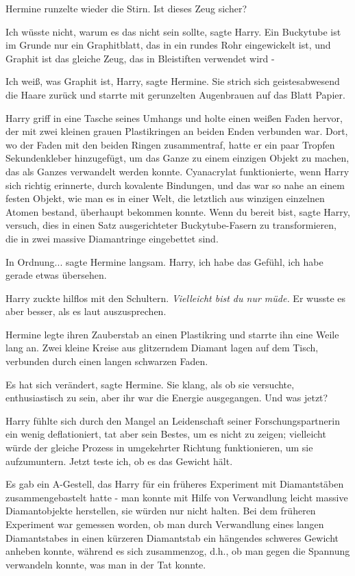 Hermine runzelte wieder die Stirn. \glqq{}Ist dieses Zeug sicher?\grqq{}

\glqq{}Ich wüsste nicht, warum es das nicht sein sollte\grqq{}, sagte Harry.
\glqq{}Ein Buckytube ist im Grunde nur ein Graphitblatt, das in ein rundes Rohr
eingewickelt ist, und Graphit ist das gleiche Zeug, das in Bleistiften verwendet
wird -\grqq{}

\glqq{}Ich weiß, was Graphit ist, Harry\grqq{}, sagte Hermine. Sie strich sich
geistesabwesend die Haare zurück und starrte mit gerunzelten Augenbrauen auf das
Blatt Papier.

Harry griff in eine Tasche seines Umhangs und holte einen weißen Faden hervor,
der mit zwei kleinen grauen Plastikringen an beiden Enden verbunden war. Dort,
wo der Faden mit den beiden Ringen zusammentraf, hatte er ein paar Tropfen
Sekundenkleber hinzugefügt, um das Ganze zu einem einzigen Objekt zu machen, das
als Ganzes verwandelt werden konnte. Cyanacrylat funktionierte, wenn Harry sich
richtig erinnerte, durch kovalente Bindungen, und das war so nahe an einem
\glqq{}festen Objekt\grqq{}, wie man es in einer Welt, die letztlich aus
winzigen einzelnen Atomen bestand, überhaupt bekommen konnte. \glqq{}Wenn du
bereit bist\grqq{}, sagte Harry, \glqq{}versuch, dies in einen Satz
ausgerichteter Buckytube-Fasern zu transformieren, die in zwei massive
Diamantringe eingebettet sind.\grqq{}

\glqq{}In Ordnung...\grqq{} sagte Hermine langsam. \glqq{}Harry, ich habe das
Gefühl, ich habe gerade etwas übersehen.\grqq{}

Harry zuckte hilflos mit den Schultern. \emph{Vielleicht bist du nur müde.} Er
wusste es aber besser, als es laut auszusprechen.

Hermine legte ihren Zauberstab an einen Plastikring und starrte ihn eine Weile
lang an. Zwei kleine Kreise aus glitzerndem Diamant lagen auf dem Tisch,
verbunden durch einen langen schwarzen Faden.

\glqq{}Es hat sich verändert\grqq{}, sagte Hermine. Sie klang, als ob sie
versuchte, enthusiastisch zu sein, aber ihr war die Energie ausgegangen. \glqq{}
Und was jetzt?\grqq{}

Harry fühlte sich durch den Mangel an Leidenschaft seiner Forschungspartnerin
ein wenig deflationiert, tat aber sein Bestes, um es nicht zu zeigen; vielleicht
würde der gleiche Prozess in umgekehrter Richtung funktionieren, um sie
aufzumuntern. \glqq{}Jetzt teste ich, ob es das Gewicht hält.\grqq{}

Es gab ein A-Gestell, das Harry für ein früheres Experiment mit Diamantstäben
zusammengebastelt hatte - man konnte mit Hilfe von Verwandlung leicht massive
Diamantobjekte herstellen, sie würden nur nicht halten. Bei dem früheren
Experiment war gemessen worden, ob man durch Verwandlung eines langen
Diamantstabes in einen kürzeren Diamantstab ein hängendes schweres Gewicht
anheben konnte, während es sich zusammenzog, d.h., ob man gegen die Spannung
verwandeln konnte, was man in der Tat konnte.

